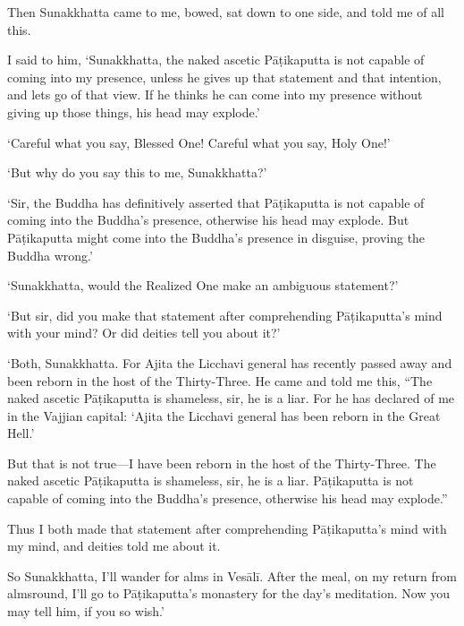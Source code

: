 \documentclass[12pt,openany]{book}%
\begin{document}
Then Sunakkhatta came to me, bowed, sat down to one side, and told me of all this. 

I said to him, ‘Sunakkhatta, the naked ascetic \textsanskrit{Pāṭikaputta} is not capable of coming into my presence, unless he gives up that statement and that intention, and lets go of that view. If he thinks he can come into my presence without giving up those things, his head may explode.’ 

‘Careful what you say, Blessed One! Careful what you say, Holy One!’ 

‘But why do you say this to me, Sunakkhatta?’ 

‘Sir, the Buddha has definitively asserted that \textsanskrit{Pāṭikaputta} is not capable of coming into the Buddha’s presence, otherwise his head may explode. But \textsanskrit{Pāṭikaputta} might come into the Buddha’s presence in disguise, proving the Buddha wrong.’ 

‘Sunakkhatta, would the Realized One make an ambiguous statement?’ 

‘But sir, did you make that statement after comprehending \textsanskrit{Pāṭikaputta}’s mind with your mind? Or did deities tell you about it?’ 

‘Both, Sunakkhatta. For Ajita the Licchavi general has recently passed away and been reborn in the host of the Thirty-Three. He came and told me this, “The naked ascetic \textsanskrit{Pāṭikaputta} is shameless, sir, he is a liar. For he has declared of me in the Vajjian capital: ‘Ajita the Licchavi general has been reborn in the Great Hell.’ 

But that is not true—I have been reborn in the host of the Thirty-Three. The naked ascetic \textsanskrit{Pāṭikaputta} is shameless, sir, he is a liar. \textsanskrit{Pāṭikaputta} is not capable of coming into the Buddha’s presence, otherwise his head may explode.” 

Thus I both made that statement after comprehending \textsanskrit{Pāṭikaputta}’s mind with my mind, and deities told me about it. 

So Sunakkhatta, I’ll wander for alms in \textsanskrit{Vesālī}. After the meal, on my return from almsround, I’ll go to \textsanskrit{Pāṭikaputta}’s monastery for the day’s meditation. Now you may tell him, if you so wish.’ 
\end{document}
